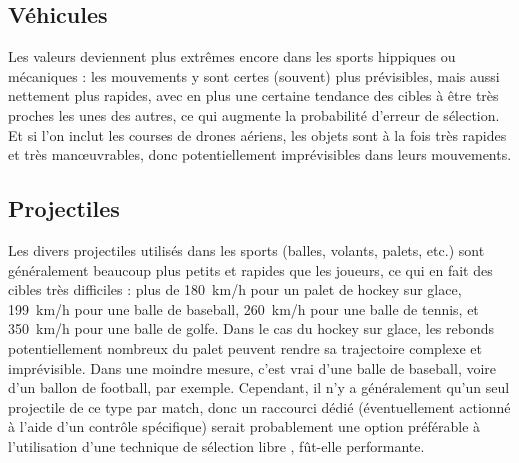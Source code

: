 	
	\FloatBarrier \subsection{Véhicules}
	Les valeurs deviennent plus extrêmes encore dans les sports hippiques ou mécaniques : les mouvements y sont certes (souvent) plus prévisibles, mais aussi nettement plus rapides, avec en plus une certaine tendance des cibles à être très proches les unes des autres, ce qui augmente la probabilité d'erreur de sélection. Et si l'on inclut les courses de drones aériens,\footnotemark{} les objets sont à la fois très rapides et très manœuvrables, donc potentiellement imprévisibles dans leurs mouvements.
	
	
	\subsection{Projectiles}
	\label{sub:projectiles}
	Les divers projectiles utilisés dans les sports (balles, volants, palets, etc.) sont généralement beaucoup plus petits et rapides que les joueurs, ce qui en fait des cibles très difficiles : plus de 180~km/h pour un palet de hockey sur glace,\footnotemark{} 199~km/h pour une balle de baseball,\footnotemark{} 260~km/h pour une balle de tennis,\footnotemark{} et 350~km/h pour une balle de golfe.\footnotemark{} Dans le cas du hockey sur glace, les rebonds potentiellement nombreux du palet peuvent rendre sa trajectoire complexe et imprévisible. Dans une moindre mesure, c'est vrai d'une balle de baseball, voire d'un ballon de football, par exemple. Cependant, il n'y a généralement qu'un seul projectile de ce type par match, donc un raccourci dédié (éventuellement actionné à l'aide d'un contrôle spécifique) serait probablement une option préférable à l'utilisation d'une technique de sélection \og libre \fg{}, fût-elle performante.
	
	\addtocounter{footnote}{-3}
	
	\addtocounter{footnote}{1}
	
	\addtocounter{footnote}{1}
	
